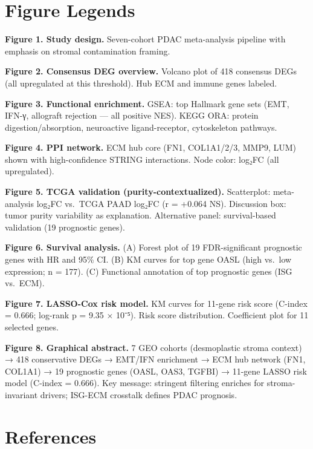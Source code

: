 \documentclass[
  12pt,
]{article}
\begin{document}
\section{Figure Legends}\label{figure-legends}

\textbf{Figure 1. Study design.} Seven-cohort PDAC meta-analysis
pipeline with emphasis on stromal contamination framing.

\textbf{Figure 2. Consensus DEG overview.} Volcano plot of 418 consensus
DEGs (all upregulated at this threshold). Hub ECM and immune genes
labeled.

\textbf{Figure 3. Functional enrichment.} GSEA: top Hallmark gene sets
(EMT, IFN-γ, allograft rejection --- all positive NES). KEGG ORA:
protein digestion/absorption, neuroactive ligand-receptor, cytoskeleton
pathways.

\textbf{Figure 4. PPI network.} ECM hub core (FN1, COL1A1/2/3, MMP9,
LUM) shown with high-confidence STRING interactions. Node color: log₂FC
(all upregulated).

\textbf{Figure 5. TCGA validation (purity-contextualized).} Scatterplot:
meta-analysis log₂FC vs.~TCGA PAAD log₂FC (r = +0.064 NS). Discussion
box: tumor purity variability as explanation. Alternative panel:
survival-based validation (19 prognostic genes).

\textbf{Figure 6. Survival analysis.} (A) Forest plot of 19
FDR-significant prognostic genes with HR and 95\% CI. (B) KM curves for
top gene OASL (high vs.~low expression; n = 177). (C) Functional
annotation of top prognostic genes (ISG vs.~ECM).

\textbf{Figure 7. LASSO-Cox risk model.} KM curves for 11-gene risk
score (C-index = 0.666; log-rank p = 9.35 × 10⁻⁵). Risk score
distribution. Coefficient plot for 11 selected genes.

\textbf{Figure 8. Graphical abstract.} 7 GEO cohorts (desmoplastic
stroma context) → 418 conservative DEGs → EMT/IFN enrichment → ECM hub
network (FN1, COL1A1) → 19 prognostic genes (OASL, OAS3, TGFBI) →
11-gene LASSO risk model (C-index = 0.666). Key message: stringent
filtering enriches for stroma-invariant drivers; ISG-ECM crosstalk
defines PDAC prognosis.

\section{References}\label{references}
\end{document}
